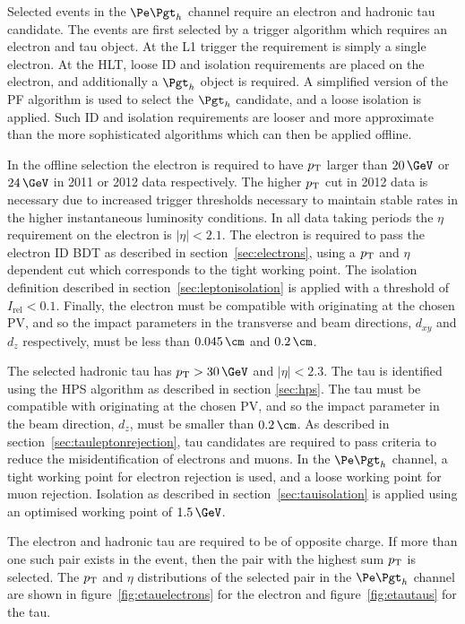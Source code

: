 Selected events in the $\etau$ channel require an electron and hadronic tau
candidate. The events are first selected by a trigger algorithm which requires
an electron and tau object. At the \ac{L1} trigger the requirement is simply a
single electron. At the \ac{HLT}, loose ID and isolation requirements are placed on the
electron, and additionally a $\Pgth$ object is required. A simplified version of
the \ac{PF} algorithm is used to select the $\Pgth$ candidate, and a loose
isolation is applied. Such ID and isolation requirements are looser and more approximate
than the more sophisticated algorithms which can then be applied offline.  

In the offline selection the electron is required to have $p_{\mathrm{T}}$ larger than $20\,\GeV$
or $24\,\GeV$ in 2011 or 2012 data respectively. The higher $p_{\mathrm{T}}$ cut in 2012 data is necessary
due to increased trigger thresholds necessary to maintain stable rates in the
higher instantaneous luminosity conditions. In all data taking periods the $\eta$ requirement
on the electron is $|\eta| < 2.1$. The electron is required to pass the electron
ID \ac{BDT} as described in section~\ref{sec:electrons}, using a $p_{\mathrm{T}}$ and
$\eta$ dependent cut which corresponds to the tight working point.  
The isolation definition described in section~\ref{sec:leptonisolation} is
applied with a threshold of $I_{\text{rel}} < 0.1$. Finally, the electron must be compatible with
originating at the chosen \ac{PV}, and so the impact parameters in the
transverse and beam directions, $d_{xy}$ and $d_{z}$ respectively, must be 
less than $0.045\,\cm$ and $0.2\,\cm$. 

The selected hadronic tau has $\pt > 30\,\GeV$ and $|\eta|<2.3$. 
The tau is identified using the \ac{HPS} algorithm as described in 
section \ref{sec:hps}. The tau must be compatible with
originating at the chosen \ac{PV}, and so the impact parameter in the beam
direction, $d_{z}$, must be smaller than $0.2\,\cm$. %
As described in section~\ref{sec:tauleptonrejection}, 
tau candidates are required to pass criteria to reduce the misidentification of electrons and
muons. In the $\etau$ channel, a tight working point for electron rejection is
used, and a loose working point for muon rejection. Isolation as described in
section~\ref{sec:tauisolation} is applied using an optimised working point of
$1.5\,\GeV$.  

The electron and hadronic tau are required to be of opposite charge. If more
than one such pair exists in the event, then the pair with the highest sum $p_{\mathrm{T}}$
is selected. The $p_{\mathrm{T}}$ and $\eta$ distributions of the selected pair in the
$\etau$ channel are shown in figure~\ref{fig:etauelectrons} for the electron and
figure~\ref{fig:etautaus} for the tau. 


